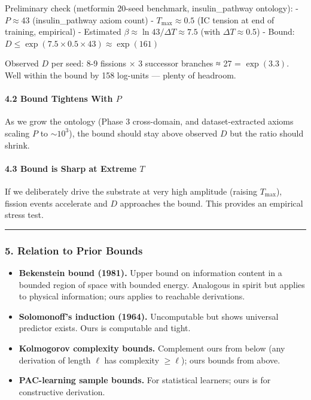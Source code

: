 \documentclass[
  11pt,
  a4paper,
]{article}
\providecommand{\tightlist}{%
  \setlength{\itemsep}{0pt}\setlength{\parskip}{0pt}}
\begin{document}
Preliminary check (metformin 20-seed benchmark, insulin\_pathway
ontology): - \(P \approx 43\) (insulin\_pathway axiom count) -
\(T_\text{max} \approx 0.5\) (IC tension at end of training, empirical)
- Estimated \(\beta \approx \ln 43 / \Delta T \approx 7.5\) (with
\(\Delta T \approx 0.5\)) - Bound:
\(D \leq \exp(7.5 \times 0.5 \times 43) \approx \exp(161)\)

Observed \(D\) per seed: 8-9 fissions × 3 successor branches ≈ 27 =
\(\exp(3.3)\). Well within the bound by 158 log-units --- plenty of
headroom.

\paragraph{\texorpdfstring{4.2 Bound Tightens With
\(P\)}{4.2 Bound Tightens With P}}\label{bound-tightens-with-p}

As we grow the ontology (Phase 3 cross-domain, and dataset-extracted
axioms scaling \(P\) to \(\sim 10^3\)), the bound should stay above
observed \(D\) but the ratio should shrink.

\paragraph{\texorpdfstring{4.3 Bound is Sharp at Extreme
\(T\)}{4.3 Bound is Sharp at Extreme T}}\label{bound-is-sharp-at-extreme-t}

If we deliberately drive the substrate at very high amplitude (raising
\(T_\text{max}\)), fission events accelerate and \(D\) approaches the
bound. This provides an empirical stress test.

\begin{center}\rule{0.5\linewidth}{0.5pt}\end{center}

\subsubsection{5. Relation to Prior
Bounds}\label{relation-to-prior-bounds}

\begin{itemize}
\tightlist
\item
  \textbf{Bekenstein bound (1981).} Upper bound on information content
  in a bounded region of space with bounded energy. Analogous in spirit
  but applies to physical information; ours applies to reachable
  derivations.
\item
  \textbf{Solomonoff's induction (1964).} Uncomputable but shows
  universal predictor exists. Ours is computable and tight.
\item
  \textbf{Kolmogorov complexity bounds.} Complement ours from below (any
  derivation of length \(\ell\) has complexity \(\geq \ell\)); ours
  bounds from above.
\item
  \textbf{PAC-learning sample bounds.} For statistical learners; ours is
  for constructive derivation.
\end{itemize}
\end{document}
